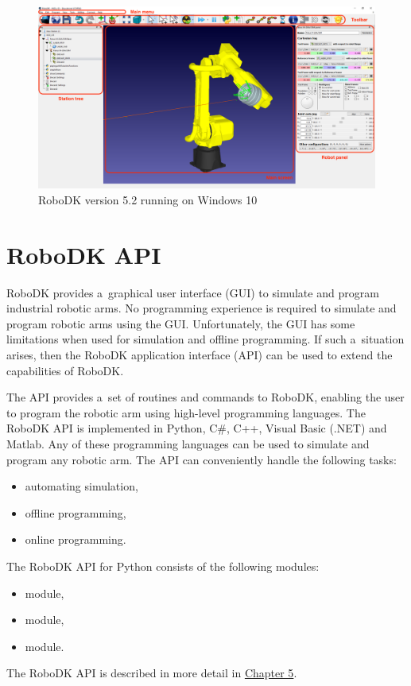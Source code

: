 \begin{figure}[h]
    \centering
    \includegraphics[width=0.9\linewidth]{img/robodk_interface_v_2.png}
    \caption{RoboDK version 5.2 running on Windows 10}
    \label{fig:robodkinterface}
\end{figure}

\section{RoboDK API}

RoboDK provides a~graphical user interface (GUI) to simulate and program industrial robotic arms. No programming experience is required to simulate and program robotic arms using the GUI. Unfortunately, the GUI has some limitations when used for simulation and offline programming. If such a~situation arises, then the RoboDK application interface (API) can be used to extend the capabilities of RoboDK.

The API provides a~set of routines and commands to RoboDK, enabling the user to program the robotic arm using high-level programming languages. The RoboDK API is implemented in Python, C\#, C++, Visual Basic (.NET) and Matlab. Any of these programming languages can be used to simulate and program any robotic arm. The API can conveniently handle the following tasks:

\begin{itemize}
    \item automating simulation,
    \item offline programming,
    \item online programming.

\end{itemize}

The RoboDK API for Python consists of the following modules:


\begin{itemize}
    \item {} module, 
    \item {} module, 
    \item {} module.
\end{itemize}
The RoboDK API is described in more detail in \hyperref[chap:implementation]{Chapter 5}.

